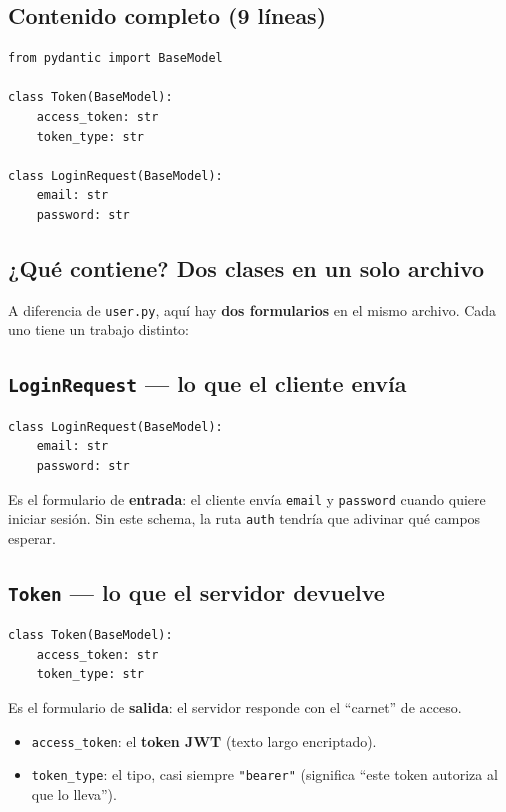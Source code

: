 \documentclass[11pt,a4paper]{article}
\begin{document}
\subsection{Contenido completo (9 líneas)}

\begin{lstlisting}
from pydantic import BaseModel

class Token(BaseModel):
    access_token: str
    token_type: str

class LoginRequest(BaseModel):
    email: str
    password: str
\end{lstlisting}

\subsection{¿Qué contiene? Dos clases en un solo archivo}

A diferencia de \texttt{user.py}, aquí hay \textbf{dos formularios} en el mismo archivo.
Cada uno tiene un trabajo distinto:

\subsection{\texttt{LoginRequest} --- lo que el cliente \textbf{envía}}

\begin{lstlisting}
class LoginRequest(BaseModel):
    email: str
    password: str
\end{lstlisting}

Es el formulario de \textbf{entrada}: el cliente envía \texttt{email} y \texttt{password}
cuando quiere iniciar sesión. Sin este schema, la ruta \texttt{auth} tendría que adivinar
qué campos esperar.

\subsection{\texttt{Token} --- lo que el servidor \textbf{devuelve}}

\begin{lstlisting}
class Token(BaseModel):
    access_token: str
    token_type: str
\end{lstlisting}

Es el formulario de \textbf{salida}: el servidor responde con el ``carnet'' de acceso.

\begin{itemize}
    \item \texttt{access\_token}: el \textbf{token JWT} (texto largo encriptado).
    \item \texttt{token\_type}: el tipo, casi siempre \texttt{"bearer"} (significa ``este token
    autoriza al que lo lleva'').
\end{itemize}
\end{document}
